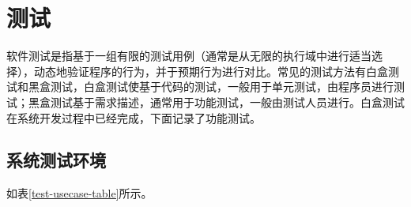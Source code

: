 \section{测试}

软件测试是指基于一组有限的测试用例（通常是从无限的执行域中进行适当选择），动态地验证程序的行为，并于预期行为进行对比\cite{.software}。常见的测试方法有白盒测试和黑盒测试，白盒测试使基于代码的测试，一般用于单元测试，由程序员进行测试；黑盒测试基于需求描述，通常用于功能测试，一般由测试人员进行。白盒测试在系统开发过程中已经完成，下面记录了功能测试。

\subsection{系统测试环境}

如表\ref{test-usecase-table}所示。

